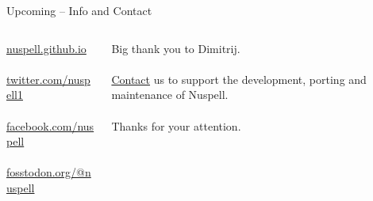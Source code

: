 \documentclass{beamer}
\begin{document}
\begin{frame}{Upcoming – Info and Contact}
\begin{columns}
\begin{column}{0.5\textwidth}
\href{https://nuspell.github.io}{nuspell.github.io}
\\\mbox{}\\
\href{https://twitter.com/nuspell1}{twitter.com/nuspell1}
\\\mbox{}\\
\href{https://facebook.com/nuspell}{facebook.com/nuspell}
\\\mbox{}\\
\href{https://fosstodon.org/@nuspell}{fosstodon.org/@nuspell}
\end{column}
\begin{column}{0.5\textwidth}
Big thank you to Dimitrij.
\\\mbox{}\\
\href{mailto:sander@hellebaard.nl?subject=Nuspell}{Contact} us to support the development, porting and maintenance of Nuspell.
\\\mbox{}\\
Thanks for your attention.
\end{column}
\end{columns}
\end{frame}
\end{document}
